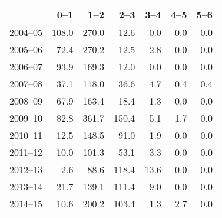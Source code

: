 \begin{table}[ht]
\centering
\begin{tabular}{rrrrrrr}
  \hline
 & 0--1 & 1--2 & 2--3 & 3--4 & 4--5 & 5--6 \\ 
  \hline
2004--05 & 108.0 & 270.0 & 12.6 & 0.0 & 0.0 & 0.0 \\ 
  2005--06 & 72.4 & 270.2 & 12.5 & 2.8 & 0.0 & 0.0 \\ 
  2006--07 & 93.9 & 169.3 & 12.0 & 0.0 & 0.0 & 0.0 \\ 
  2007--08 & 37.1 & 118.0 & 36.6 & 4.7 & 0.4 & 0.4 \\ 
  2008--09 & 67.9 & 163.4 & 18.4 & 1.3 & 0.0 & 0.0 \\ 
  2009--10 & 82.8 & 361.7 & 150.4 & 5.1 & 1.7 & 0.0 \\ 
  2010--11 & 12.5 & 148.5 & 91.0 & 1.9 & 0.0 & 0.0 \\ 
  2011--12 & 10.0 & 101.3 & 53.1 & 3.3 & 0.0 & 0.0 \\ 
  2012--13 & 2.6 & 88.6 & 118.4 & 13.6 & 0.0 & 0.0 \\ 
  2013--14 & 21.7 & 139.1 & 111.4 & 9.0 & 0.0 & 0.0 \\ 
  2014--15 & 10.6 & 200.2 & 103.4 & 1.3 & 2.7 & 0.0 \\ 
   \hline
\end{tabular}
\end{table}
